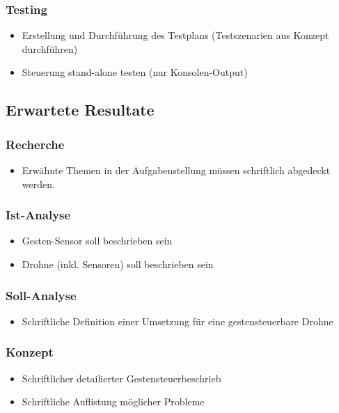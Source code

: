 \subsubsection{Testing}
\begin{itemize}
	\item Erstellung und Durchführung des Testplans (Testszenarien aus Konzept durchführen)
	\item Steuerung stand-alone testen (nur Konsolen-Output)
\end{itemize}

\subsection{Erwartete Resultate}
\subsubsection{Recherche}
\begin{itemize}
	\item Erwähnte Themen in der Aufgabenstellung müssen schriftlich abgedeckt werden.
\end{itemize}

\subsubsection{Ist-Analyse}
\begin{itemize}
	\item Gesten-Sensor soll beschrieben sein
	\item Drohne (inkl. Sensoren) soll beschrieben sein
\end{itemize}

\subsubsection{Soll-Analyse}
\begin{itemize}
	\item Schriftliche Definition einer Umsetzung für eine gestensteuerbare Drohne
\end{itemize}

\subsubsection{Konzept}
\begin{itemize}
	\item Schriftlicher detailierter Gestensteuerbeschrieb
	\item Schriftliche Auflistung möglicher Probleme
\end{itemize}

